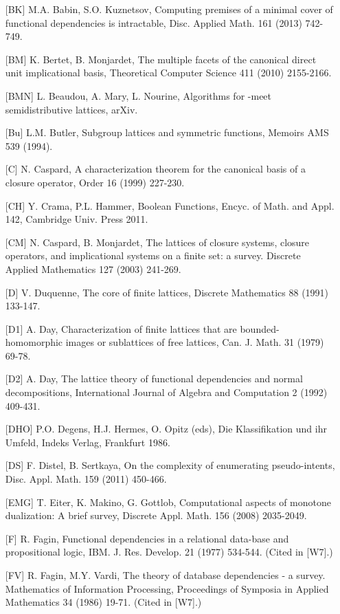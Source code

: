 \documentclass[11pt]{article}
\begin{document}
\begin{enumerate}
\item[{[BK]}] M.A. Babin, S.O. Kuznetsov, Computing premises of a minimal cover of functional dependencies is intractable, Disc. Applied Math. 161 (2013) 742-749.
	\item[{[BM]}] K. Bertet, B. Monjardet, The multiple facets of the canonical direct unit implicational basis, Theoretical Computer Science 411 (2010) 2155-2166.
\item[{[BMN]}] L. Beaudou, A. Mary, L. Nourine, Algorithms for -meet semidistributive lattices, arXiv.
\item[{[Bu]}] L.M. Butler, Subgroup lattices and symmetric functions, Memoirs AMS 539 (1994).
\item[{[C]}] N. Caspard, A characterization theorem for the canonical basis of a closure operator, Order 16 (1999) 227-230.
\item[{[CH]}] Y. Crama, P.L. Hammer, Boolean Functions, Encyc. of Math. and Appl. 142, Cambridge Univ. Press 2011.
\item[{[CM]}] N. Caspard, B. Monjardet, The lattices of closure systems, closure operators, and implicational systems on a finite set: a survey. Discrete Applied Mathematics 127 (2003) 241-269.
\item[{[D]}] V. Duquenne, The core of finite lattices, Discrete Mathematics 88 (1991) 133-147.
\item[{[D1]}] A. Day, Characterization of finite lattices that are bounded-homomorphic images or sublattices of free lattices, Can. J. Math. 31 (1979) 69-78.
\item[{[D2]}] A. Day, The lattice theory of functional dependencies and normal decompositions, International Journal of Algebra and Computation 2 (1992) 409-431.
\item[{[DHO]}] P.O. Degens, H.J. Hermes, O. Opitz (eds), Die Klassifikation und ihr Umfeld, Indeks Verlag, Frankfurt 1986.
\item[{[DS]}] F. Distel, B. Sertkaya, On the complexity of enumerating pseudo-intents, Disc. Appl. Math. 159 (2011) 450-466.
\item[{[EMG]}] T. Eiter, K. Makino, G. Gottlob, Computational aspects of monotone dualization: A brief survey, Discrete Appl. Math. 156 (2008) 2035-2049.
\item[{[F]}] R. Fagin, Functional dependencies in a relational data-base and propositional logic, IBM. J. Res. Develop. 21 (1977) 534-544. (Cited in [W7].)
\item[{[FV]}] R. Fagin, M.Y. Vardi, The theory of database dependencies - a survey. Mathematics of Information Processing, Proceedings of Symposia in Applied Mathematics 34 (1986) 19-71. (Cited in [W7].)

\end{enumerate}
\end{document}
